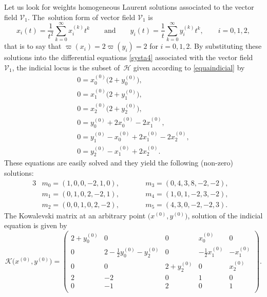 \documentclass[pdftex]{sigma}
\numberwithin{equation}{section}
\begin{document}
Let us look for weights homogeneous Laurent solutions associated to
the vector field $\mathcal{V}_1$. The~solution form of vector field
$\mathcal{V}_1$ is
\[x_i(t)=\frac{1}{t^{2}}\sum_{k=0}^\infty x_i
^{(k)}t^k \qquad \text{and} \qquad
y_i(t)=\frac{1}{t}\sum_{k=0}^\infty
y_i^{(k)}t^k, \qquad i=0,1,2,\]
that is to say
that $\varpi(x_i)=2\varpi(y_i)=2$ for $i=0,1,
$2. By substituting these solutions into the differential equations
\eqref{systa4} associated with the vector field $\mathcal{V}_1$, the
indicial locus is the subset of~$\mathcal{H}$ given according to
\eqref{equaindicial} by
\begin{gather*}
 0 = x_0^{(0)}\bigl(2+y_0^{(0)}\bigr), \\
 0 = x_1^{(0)}\bigl(2+y_1^{(0)}\bigr),\\
 0 = x_2^{(0)}\bigl(2+y_2^{(0)}\bigr), \\
 0 = y_0^{(0)}+2x_0^{(0)}-2x_1^{(0)},\\
 0 = y_1^{(0)}-x_0^{(0)}+2x_1^{(0)}-2x_2^{(0) } ,\\
 0 = y_2^{(0)}-x_1^{(0)}+2x_2^{(0)}.
\end{gather*}
These equations are easily solved and they yield the following
(non-zero) solutions:
 \begin{alignat*}{3}
& m_0= (1,0,0,-2,1,0), \qquad && m_3= (0,4,3,8,-2,-2), &\\
& m_1= (0,1,0,2,-2,1), \qquad && m_4= (1,0,1,-2,3,-2), &\\
& m_2= (0,0,1,0,2,-2), \qquad && m_5= (4,3,0,-2,-2,3).&
 \end{alignat*}
 The Kowalevski matrix at an arbitrary point
$\bigl(x^{(0)},y^{(0)}\bigr)$,
 solution of the indicial equation is given by
 \[\mathcal{K}\bigl(x^{(0)},y^{(0)}\bigr)
 =\begin{pmatrix}
 2+ y_0^{(0)}& 0 & 0 & x_0^{(0)} & 0 \\
 0 & 2- \frac{1}{2}y_0^{(0)}-y_2^{(0)}& 0 &-\frac{1}{2}x_1^{ (0)} & -x_1^{(0)} \\[1mm]
 0 & 0 & 2+ y_2^{(0)} & 0 & x_2^{(0)}\\
 2 & -2 & 0 & 1 & 0 \\
 0 & -1 & 2 & 0 & 1 \\
 \end{pmatrix}.\]
\end{document}
